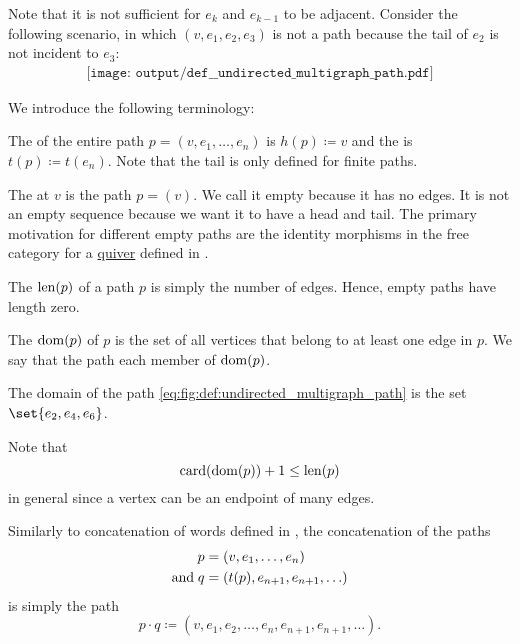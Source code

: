 \begin{definition}
  Note that it is not sufficient for \( e_k \) and \( e_{k-1} \) to be adjacent. Consider the following scenario, in which \( (v, e_1, e_2, e_3) \) is not a path because the tail of \( e_2 \) is not incident to \( e_3 \):
  \begin{equation}\label{eq:def:undirected_multigraph_path/almost_directed}
    \begin{aligned}
      \texttt{[image: output/def\_\_undirected\_multigraph\_path.pdf]}
    \end{aligned}
  \end{equation}

  We introduce the following terminology:
  \begin{thmenum}
     The  of the entire path \( p = (v, e_1, \ldots, e_n) \) is \( h(p) \coloneqq v \) and the  is \( t(p) \coloneqq t(e_n) \). Note that the tail is only defined for finite paths.

     The  at \( v \) is the path \( p = (v) \). We call it empty because it has no edges. It is not an empty sequence because we want it to have a head and tail. The primary motivation for different empty paths are the identity morphisms in the free category for a \hyperref[def:quiver]{quiver} defined in .

     The  \( \operatorname{len}(p) \) of a path \( p \) is simply the number of edges. Hence, empty paths have length zero.

     The  \( \operatorname{dom}(p) \) of \( p \) is the set of all vertices that belong to at least one edge in \( p \). We say that the path  each member of \( \operatorname{dom}(p) \).

    The domain of the path \eqref{eq:fig:def:undirected_multigraph_path} is the set \( \set{ e_2, e_4, e_6 } \).

    Note that
    \begin{equation}\label{eq:def:undirected_multigraph_path/length_and_domain}
      \operatorname{card}(\operatorname{dom}(p)) + 1 \leq \operatorname{len}(p)
    \end{equation}
    in general since a vertex can be an endpoint of many edges.

     Similarly to concatenation of words defined in , the concatenation of the paths
    \begin{align*}
              p &= (v, e_1, \ldots, e_n) \\
      \T{and} q &= (t(p), e_{n+1}, e_{n+1}, \ldots)
    \end{align*}
    is simply the path
    \begin{equation*}
      p \cdot q \coloneqq (v, e_1, e_2, \ldots, e_n, e_{n+1}, e_{n+1}, \ldots).
    \end{equation*}


\end{thmenum}
\end{definition}
